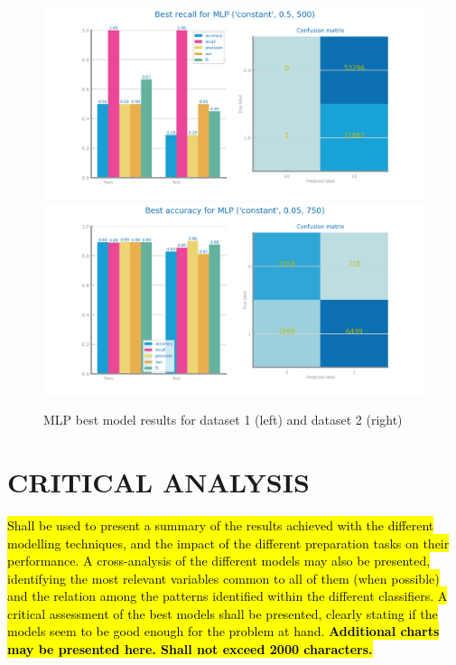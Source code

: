 \documentclass[10pt]{extarticle}
\newcommand{\ctext}[3][RGB]{%
  \begingroup
  \definecolor{hlcolor}{#1}{#2}\sethlcolor{hlcolor}%
  \hl{#3}%
  \endgroup
}
\begin{document}
\begin{figure}[H]
\centering\includegraphics[scale=0.95]{images/dataset1/models_evaluation/CovidPos_mlp_MLP_best_recall_eval.png}
\includegraphics[scale=0.95]{images/dataset2/models_evaluation/Credit_Score_mlp_MLP_best_accuracy_eval.png}
\caption{MLP best model results for dataset 1 (left) and dataset 2 (right)}
\end{figure}

\section{CRITICAL ANALYSIS}
\ctext[RGB]{190,190,190}{Shall be used to present a summary of the results achieved with the different modelling techniques, and the impact of the different preparation tasks on their performance. 
A cross-analysis of the different models may also be presented, identifying the most relevant variables common to all of them (when possible) and the relation among the patterns identified within the different classifiers.
A critical assessment of the best models shall be presented, clearly stating if the models seem to be good enough for the problem at hand. \textbf{Additional charts may be presented here.  Shall not exceed 2000 characters.}}
\end{document}
